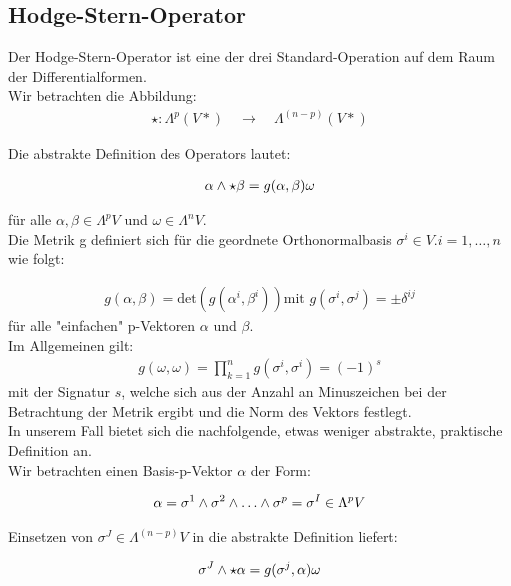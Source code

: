 \subsection{Hodge-Stern-Operator}
Der Hodge-Stern-Operator ist eine der drei Standard-Operation auf dem Raum der Differentialformen. \\
Wir betrachten die Abbildung:
\begin{align*}
\star : \Lambda^p(V*) \quad \rightarrow \quad  \Lambda^{(n-p)}(V*) 
\end{align*}

Die abstrakte Definition des Operators lautet: 

\begin{align}
\alpha \wedge \star \beta = g(\alpha,\beta) \omega 
\end{align}
 
 für alle  $\alpha, \beta \in \Lambda^p V$ und  $\omega \in \Lambda^n V $.\\
 Die Metrik g definiert sich für die geordnete Orthonormalbasis {$\sigma^{i} \in V. i=1,\dots,n$} wie folgt:

 \begin{align}
g(\alpha,\beta) = \text{det}\left( g(\alpha^{i}, \beta^{i})\right) \text{mit } g(\sigma^{i},\sigma^{j}) = \pm \delta^{ij}
 \end{align}
  für alle "einfachen" p-Vektoren $\alpha$ und $\beta$. \\
Im Allgemeinen gilt:
 \begin{align}
 g(\omega,\omega) = \prod_{k=1}^{n} g(\sigma^{i},\sigma^{i}) = (-1)^s
 \end{align}
 mit der Signatur $s$, welche sich aus der Anzahl an Minuszeichen bei der Betrachtung der Metrik ergibt und die Norm des Vektors festlegt. \\
 In unserem Fall bietet sich die nachfolgende, etwas weniger abstrakte, praktische Definition an. \\
 Wir betrachten einen Basis-p-Vektor $\alpha$ der Form:
 
 \begin{align}
 \alpha= \sigma^{1} \w \sigma^{2} \w \dots \w \sigma^{p} = \sigma^{I} \in \Lambda^p V
 \end{align}
 
 Einsetzen von $\sigma^{J} \in \Lambda^{(n-p)}V$ in die abstrakte Definition liefert:
 

\begin{align}
\sigma^{J} \wedge \star \alpha= g(\sigma^{j},\alpha) \omega 
\end{align}

